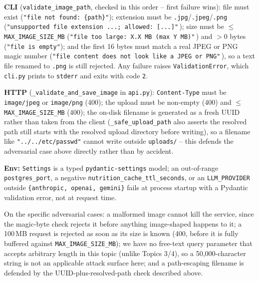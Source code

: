 \documentclass[11pt,a4paper]{article}
\begin{document}
\par\noindent
\textbf{CLI} (\texttt{validate\_image\_path}, checked in this order --
first failure wins): file must exist (\texttt{"file not found: \{path\}"});
extension must be \texttt{.jpg}/\texttt{.jpeg}/\texttt{.png}
(\texttt{"unsupported file extension ...; allowed: [...]"}\,); size must be
$\leq$ \texttt{MAX\_IMAGE\_SIZE\_MB} (\texttt{"file too large: X.X MB (max
Y MB)"}\,) and $>0$ bytes (\texttt{"file is empty"}); and the first 16 bytes
must match a real JPEG or PNG magic number (\texttt{"file content does not
look like a JPEG or PNG"}\,), so a text file renamed to \texttt{.png} is
still rejected. Any failure raises \texttt{ValidationError}, which
\texttt{cli.py} prints to \texttt{stderr} and exits with code \texttt{2}.

\par\noindent
\textbf{HTTP} (\texttt{\_validate\_and\_save\_image} in \texttt{api.py}):
\texttt{Content-Type} must be \texttt{image/jpeg} or \texttt{image/png}
(400); the upload must be non-empty (400) and $\leq$
\texttt{MAX\_IMAGE\_SIZE\_MB} (400); the on-disk filename is generated as a
fresh UUID rather than taken from the client (\texttt{\_safe\_upload\_path}
also asserts the resolved path still starts with the resolved upload
directory before writing), so a filename like \texttt{"../../etc/passwd"}
cannot write outside \texttt{uploads/} -- this defends the adversarial
case above directly rather than by accident.

\par\noindent
\textbf{Env:} \texttt{Settings} is a typed \texttt{pydantic-settings} model;
an out-of-range \texttt{postgres\_port}, a negative
\texttt{nutrition\_cache\_ttl\_seconds}, or an \texttt{LLM\_PROVIDER} outside
\texttt{\{anthropic, openai, gemini\}} fails at process startup with a
Pydantic validation error, not at request time.

\par\noindent
On the specific adversarial cases: a malformed image cannot kill the
service, since the magic-byte check rejects it before anything image-shaped
happens to it; a 100\,MB request is rejected as soon as its size is known
(400, before it is fully buffered against \texttt{MAX\_IMAGE\_SIZE\_MB}); we
have no free-text query parameter that accepts arbitrary length in this
topic (unlike Topics 3/4), so a 50{,}000-character string is not an
applicable attack surface here; and a path-escaping filename is defended
by the UUID-plus-resolved-path check described above.
\end{document}
